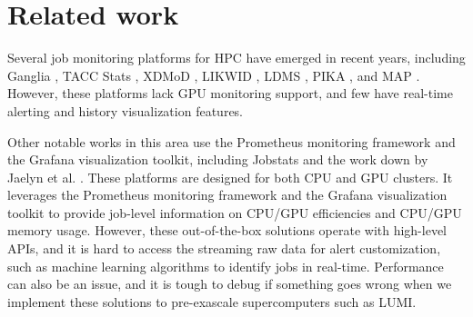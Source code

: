 \section{Related work}

Several job monitoring platforms for HPC have emerged in recent years, including Ganglia \cite{MASSIE2004817}, TACC Stats \cite{7081222}, XDMoD \cite{7106398}, LIKWID \cite{8049016}, LDMS \cite{10.1145/3225058.3225086}, PIKA \cite{9229636}, and MAP \cite{9229613,9556031}. However, these platforms lack GPU monitoring support, and few have real-time alerting and history visualization features.

Other notable works in this area use the Prometheus monitoring framework and the Grafana visualization toolkit, including Jobstats \cite{10.1145/3569951.3604396} and the work down by Jaelyn et al. \cite{10.1145/3569951.3597554}. These platforms are designed for both CPU and GPU clusters. It leverages the Prometheus monitoring framework \cite{208870} and the Grafana visualization toolkit \cite{Chakraborty2021} to provide job-level information on CPU/GPU efficiencies and CPU/GPU memory usage. However, these out-of-the-box solutions operate with high-level APIs, and it is hard to access the streaming raw data for alert customization, such as machine learning algorithms to identify jobs in real-time. Performance can also be an issue, and it is tough to debug if something goes wrong when we implement these solutions to pre-exascale supercomputers such as LUMI.
